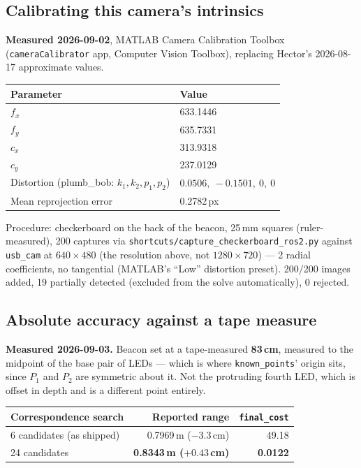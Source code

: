 \documentclass[11pt]{report}
\begin{document}
\subsection{Calibrating this camera's intrinsics}

\textbf{Measured 2026-09-02}, MATLAB Camera Calibration Toolbox
(\texttt{cameraCalibrator} app, Computer Vision Toolbox), replacing Hector's
2026-08-17 approximate values.

\begin{center}
\begin{tabular}{ll}
\toprule
Parameter & Value \\
\midrule
$f_x$ & 633.1446 \\
$f_y$ & 635.7331 \\
$c_x$ & 313.9318 \\
$c_y$ & 237.0129 \\
Distortion (plumb\_bob: $k_1,k_2,p_1,p_2$) & $0.0506,\ -0.1501,\ 0,\ 0$ \\
Mean reprojection error & 0.2782\,px \\
\bottomrule
\end{tabular}
\end{center}

Procedure: checkerboard on the back of the beacon, 25\,mm squares
(ruler-measured), 200 captures via
\texttt{shortcuts/capture\_checkerboard\_ros2.py} against \texttt{usb\_cam}
at $640\times480$ (the resolution above, not $1280\times720$) --- 2 radial
coefficients, no tangential (MATLAB's ``Low'' distortion preset). 200/200
images added, 19 partially detected (excluded from the solve
automatically), 0 rejected.

\subsection{Absolute accuracy against a tape measure}
\label{sec:ros2-absolute-accuracy}

\textbf{Measured 2026-09-03.} Beacon set at a tape-measured \textbf{83\,cm},
measured to the midpoint of the base pair of LEDs --- which is where
\texttt{known\_points}' origin sits, since $P_1$ and $P_2$ are symmetric
about it. Not the protruding fourth LED, which is offset in depth and is a
different point entirely.

\begin{center}
\begin{tabular}{lrr}
\toprule
Correspondence search & Reported range & \texttt{final\_cost} \\
\midrule
6 candidates (as shipped) & 0.7969\,m \quad($-3.3$\,cm) & 49.18 \\
24 candidates & \textbf{0.8343\,m \quad($+0.43$\,cm)} & \textbf{0.0122} \\
\bottomrule
\end{tabular}
\end{center}
\end{document}

